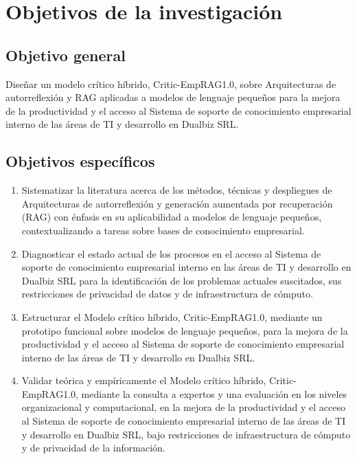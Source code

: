\section{Objetivos de la investigación}

\subsection{Objetivo general}

Diseñar un modelo crítico híbrido, \textquotedbl{}Critic-EmpRAG1.0\textquotedbl{}, sobre Arquitecturas de autorreflexión y RAG aplicadas a modelos de lenguaje pequeños para la mejora de la productividad y el acceso al Sistema de soporte de conocimiento empresarial interno de las áreas de TI y desarrollo en Dualbiz SRL.

\subsection{Objetivos específicos}

\begin{enumerate}
	
	\item Sistematizar la literatura acerca de los métodos, técnicas y despliegues de Arquitecturas de autorreflexión y generación aumentada por recuperación (RAG) con énfasis en su aplicabilidad a modelos de lenguaje pequeños, contextualizando a tareas sobre bases de conocimiento empresarial.
	
	\item Diagnosticar el estado actual de los procesos en el acceso al Sistema de soporte de conocimiento empresarial interno en las áreas de TI y desarrollo en Dualbiz SRL para la identificación de los problemas actuales suscitados, sus restricciones de privacidad de datos y de infraestructura de cómputo.
	
	\item Estructurar el Modelo crítico híbrido, Critic-EmpRAG1.0, mediante un prototipo funcional sobre modelos de lenguaje pequeños, para la mejora de la productividad y el acceso al Sistema de soporte de conocimiento empresarial interno de las áreas de TI y desarrollo en Dualbiz SRL.
	
	\item Validar teórica y empíricamente el Modelo crítico híbrido, Critic-EmpRAG1.0, mediante la consulta a expertos y una evaluación en los niveles organizacional y computacional, en la mejora de la productividad y el acceso al Sistema de soporte de conocimiento empresarial interno de las áreas de TI y desarrollo en Dualbiz SRL, bajo restricciones de infraestructura de cómputo y de privacidad de la información.	 
		
\end{enumerate}

